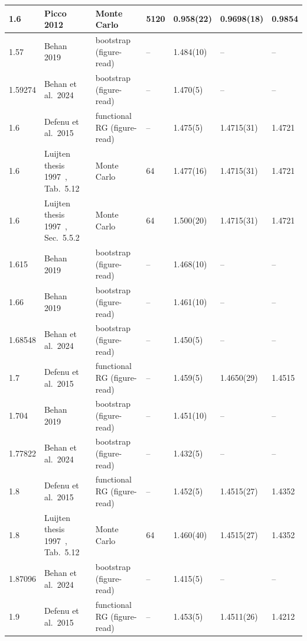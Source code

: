 \begin{table}[htbp]
\begin{tabular}{@{}lllllll@{}}
1.6 & Picco 2012~\cite{mc:Picco:2012ak} & Monte Carlo & 5120 & 0.958(22) & 0.9698(18) & 0.9854 \\
\midrule
1.57 & Behan 2019~\cite{mc:Behan:2018hfx} & bootstrap (figure-read) & -- & 1.484(10) & -- & -- \\
1.59274 & Behan et al.\ 2024~\cite{mc:Behan:2023ile} & bootstrap (figure-read) & -- & 1.470(5) & -- & -- \\
1.6 & Defenu et al.\ 2015~\cite{mc:Defenu:2014bea} & functional RG (figure-read) & -- & 1.475(5) & 1.4715(31) & 1.4721 \\
1.6 & Luijten thesis 1997~\cite{mc:Luijten:1997th}, Tab.~5.12 & Monte Carlo & 64 & 1.477(16) & 1.4715(31) & 1.4721 \\
1.6 & Luijten thesis 1997~\cite{mc:Luijten:1997th}, Sec.~5.5.2 & Monte Carlo & 64 & 1.500(20) & 1.4715(31) & 1.4721 \\
1.615 & Behan 2019~\cite{mc:Behan:2018hfx} & bootstrap (figure-read) & -- & 1.468(10) & -- & -- \\
1.66 & Behan 2019~\cite{mc:Behan:2018hfx} & bootstrap (figure-read) & -- & 1.461(10) & -- & -- \\
1.68548 & Behan et al.\ 2024~\cite{mc:Behan:2023ile} & bootstrap (figure-read) & -- & 1.450(5) & -- & -- \\
1.7 & Defenu et al.\ 2015~\cite{mc:Defenu:2014bea} & functional RG (figure-read) & -- & 1.459(5) & 1.4650(29) & 1.4515 \\
1.704 & Behan 2019~\cite{mc:Behan:2018hfx} & bootstrap (figure-read) & -- & 1.451(10) & -- & -- \\
1.77822 & Behan et al.\ 2024~\cite{mc:Behan:2023ile} & bootstrap (figure-read) & -- & 1.432(5) & -- & -- \\
1.8 & Defenu et al.\ 2015~\cite{mc:Defenu:2014bea} & functional RG (figure-read) & -- & 1.452(5) & 1.4515(27) & 1.4352 \\
1.8 & Luijten thesis 1997~\cite{mc:Luijten:1997th}, Tab.~5.12 & Monte Carlo & 64 & 1.460(40) & 1.4515(27) & 1.4352 \\
1.87096 & Behan et al.\ 2024~\cite{mc:Behan:2023ile} & bootstrap (figure-read) & -- & 1.415(5) & -- & -- \\
1.9 & Defenu et al.\ 2015~\cite{mc:Defenu:2014bea} & functional RG (figure-read) & -- & 1.453(5) & 1.4511(26) & 1.4212 \\
\bottomrule\end{tabular}
\end{table}

